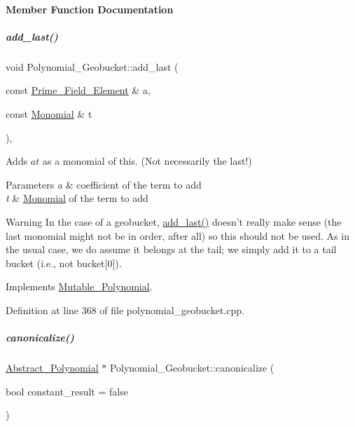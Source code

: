 \paragraph{Member Function Documentation}
\mbox{\label{group__polygroup_ada4a539d3666cd6801a75c8861bc35fa}} 
\subparagraph{\texorpdfstring{add\+\_\+last()}{add\_last()}}
{\footnotesize\ttfamily void Polynomial\+\_\+\+Geobucket\+::add\+\_\+last (\begin{DoxyParamCaption}\item[{const \hyperlink{group___fields_group_class_prime___field___element}{Prime\+\_\+\+Field\+\_\+\+Element} \&}]{a,  }\item[{const \hyperlink{group__polygroup_class_monomial}{Monomial} \&}]{t }\end{DoxyParamCaption})\hspace{0.3cm}{\ttfamily [override]}, {\ttfamily [virtual]}}



Adds $at$ as a monomial of {\ttfamily this}. (Not necessarily the last!) 


\begin{DoxyParams}{Parameters}
{\em a} & coefficient of the term to add \\
\hline
{\em t} & \hyperlink{group__polygroup_class_monomial}{Monomial} of the term to add \\
\hline
\end{DoxyParams}
\begin{DoxyWarning}{Warning}
In the case of a geobucket, \hyperlink{group__polygroup_ada4a539d3666cd6801a75c8861bc35fa}{add\+\_\+last()} doesn't really make sense (the last monomial might not be in order, after all) so this should not be used. As in the usual case, we do assume it belongs at the tail; we simply add it to a tail bucket (i.\+e., not {\ttfamily bucket\mbox{[}0\mbox{]}}). 
\end{DoxyWarning}


Implements \hyperlink{group__polygroup_a966bd6c897acf04ac697bc0a4ca46a89}{Mutable\+\_\+\+Polynomial}.



Definition at line 368 of file polynomial\+\_\+geobucket.\+cpp.

\mbox{\label{group__polygroup_aa76d2c0dce16690b01e8a8c4862b11c5}} 
\subparagraph{\texorpdfstring{canonicalize()}{canonicalize()}}
{\footnotesize\ttfamily \hyperlink{group__polygroup_class_abstract___polynomial}{Abstract\+\_\+\+Polynomial} $\ast$ Polynomial\+\_\+\+Geobucket\+::canonicalize (\begin{DoxyParamCaption}\item[{bool}]{constant\+\_\+result = {\ttfamily false} }\end{DoxyParamCaption})}



